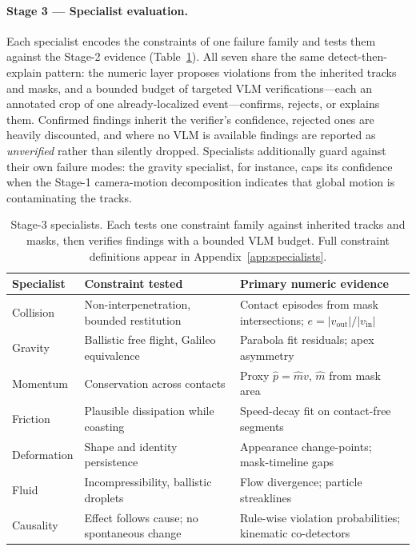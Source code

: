 \paragraph{Stage 3 --- Specialist evaluation.} Each specialist encodes the constraints of one failure family and tests them against the Stage-2 evidence (Table~\ref{tab:specialists}). All seven share the same detect-then-explain pattern: the numeric layer proposes violations from the inherited tracks and masks, and a bounded budget of targeted VLM verifications---each an annotated crop of one already-localized event---confirms, rejects, or explains them. Confirmed findings inherit the verifier's confidence, rejected ones are heavily discounted, and where no VLM is available findings are reported as \emph{unverified} rather than silently dropped. Specialists additionally guard against their own failure modes: the gravity specialist, for instance, caps its confidence when the Stage-1 camera-motion decomposition indicates that global motion is contaminating the tracks.
 
\begin{table}[t]
\centering
\caption{Stage-3 specialists. Each tests one constraint family against inherited tracks and masks, then verifies findings with a bounded VLM budget. Full constraint definitions appear in Appendix~\ref{app:specialists}.}
\label{tab:specialists}
\small
\begin{tabular}{@{}lll@{}}
\toprule
Specialist & Constraint tested & Primary numeric evidence \\
\midrule
Collision   & Non-interpenetration, bounded restitution & Contact episodes from mask intersections; $e = |v_{\text{out}}|/|v_{\text{in}}|$ \\
Gravity     & Ballistic free flight, Galileo equivalence & Parabola fit residuals; apex asymmetry \\
Momentum    & Conservation across contacts & Proxy $\hat{p} = \hat{m}v$, $\hat{m}$ from mask area \\
Friction    & Plausible dissipation while coasting & Speed-decay fit on contact-free segments \\
Deformation & Shape and identity persistence & Appearance change-points; mask-timeline gaps \\
Fluid       & Incompressibility, ballistic droplets & Flow divergence; particle streaklines \\
Causality   & Effect follows cause; no spontaneous change & Rule-wise violation probabilities; kinematic co-detectors \\
\bottomrule
\end{tabular}
\end{table}

